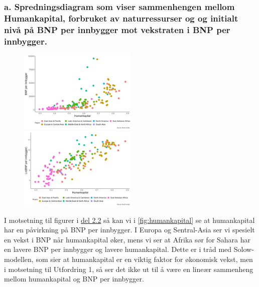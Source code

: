 \documentclass[
  12pt,
  a4paper,
  DIV=11,
  numbers=noendperiod]{scrartcl}
\begin{document}
\subsubsection{a. Spredningsdiagram som viser sammenhengen mellom
Humankapital, forbruket av naturressurser og og initialt nivå på BNP per
innbygger mot vekstraten i BNP per
innbygger.}\label{a.-spredningsdiagram-som-viser-sammenhengen-mellom-humankapital-forbruket-av-naturressurser-og-og-initialt-nivuxe5-puxe5-bnp-per-innbygger-mot-vekstraten-i-bnp-per-innbygger.}

\begin{figure}
  \centering
  \includegraphics[width=0.5\textwidth]{dokumentobjekter/figurer/humankapital_bnp_per_innbygger.png}
  \label{fig:humankapital}
  \includegraphics[width=0.5\textwidth]{dokumentobjekter/figurer/humankapital_bnp_per_innbygger_log.png}
  \label{fig:humankapital_log}
    \vspace{-8mm}
\end{figure}

I motsetning til figurer i
\hyperref[c.-tolke-resultatene-fra-spredningsdiagrammen-og-regresjonsanalysen.]{del 2.2}
så kan vi i \autoref{fig:humankapital} se at humankapital har en
påvirkning på BNP per innbygger. I Europa og Sentral-Asia ser vi
spesielt en vekst i BNP når humankapital øker, mens vi ser at Afrika sør
for Sahara har en lavere BNP per innbygger og lavere humankapital. Dette
er i tråd med Solow-modellen, som sier at humankapital er en viktig
faktor for økonomisk vekst, men i motsetning til Utfordring 1, så ser
det ikke ut til å være en lineær sammenheng mellom humankapital og BNP
per innbygger.
\end{document}
